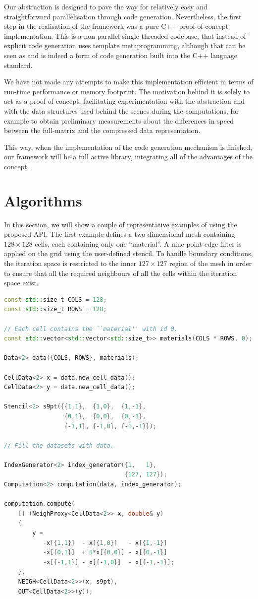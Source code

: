 \documentclass[fontsize=11pt, appendixprefix=true]{scrreprt}
\begin{document}
Our abstraction is designed to pave the way for relatively easy and
straightforward parallelisation through code generation. Nevertheless, the first
step in the realisation of the framework was a pure C++ proof-of-concept
implementation. This is a non-parallel single-threaded codebase, that instead of
explicit code generation uses template metaprogramming, although that can be
seen as and is indeed a form of code generation built into the C++ language
standard.

We have not made any attempts to make this implementation efficient in terms of
run-time performance or memory footprint. The motivation behind it is solely to
act as a proof of concept, facilitating experimentation with the abstraction and
with the data structures used behind the scenes during the computations, for
example to obtain preliminary measurements about the differences in speed
between the full-matrix and the compressed data representation.

This way, when the implementation of the code generation mechanism is finished,
our framework will be a full active library, integrating all of the advantages
of the concept.

\section{Algorithms}

In this section, we will show a couple of representative examples of using the
proposed API. The first example defines a two-dimensional mesh containing $128
\times 128$ cells, each containing only one ``material''. A nine-point edge
filter is applied on the grid using the user-defined stencil. To handle boundary
conditions, the iteration space is restricted to the inner $127 \times 127$
region of the mesh in order to ensure that all the required neighbours of all
the cells within the iteration space exist.

\begin{lstlisting}[language=c++]
const std::size_t COLS = 128;
const std::size_t ROWS = 128;

// Each cell contains the ``material'' with id 0.
const std::vector<std::vector<std::size_t>> materials(COLS * ROWS, 0);

Data<2> data({COLS, ROWS}, materials);

CellData<2> x = data.new_cell_data();
CellData<2> y = data.new_cell_data();

Stencil<2> s9pt({{1,1},  {1,0},  {1,-1},
                 {0,1},  {0,0},  {0,-1},
                 {-1,1}, {-1,0}, {-1,-1}});

// Fill the datasets with data.
	
IndexGenerator<2> index_generator({1,   1},
                                  {127, 127});
Computation<2> computation(data, index_generator);
	
computation.compute(
    [] (NeighProxy<CellData<2>> x, double& y)
    {
        y = 
           -x[{1,1}]  - x[{1,0}]   - x[{1,-1}]
           -x[{0,1}]  + 8*x[{0,0}] - x[{0,-1}]
           -x[{-1,1}] - x[{-1,0}]  - x[{-1,-1}];
    },
    NEIGH<CellData<2>>(x, s9pt),
    OUT<CellData<2>>(y));
\end{lstlisting}
\end{document}
